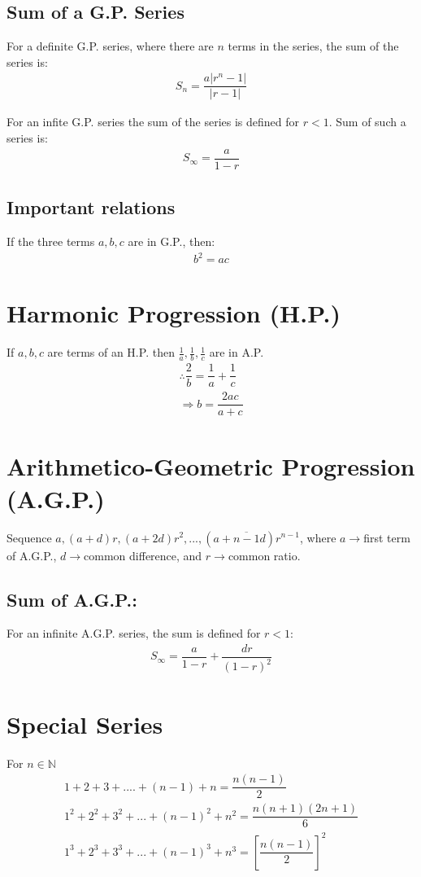 \subsection{Sum of a G.P.  Series}
For a definite G.P. series, where there are $n$ terms in the series, the sum of the series is:
\begin{align}
	S_n=\dfrac{a\lvert r^n-1 \rvert}{\lvert r-1 \rvert}
\end{align}

For an infite G.P. series the sum of the series is defined for $r<1$. Sum of such a series is:
\begin{align}
	S_\infty=\dfrac{a}{1-r}
\end{align}

\subsection{Important relations}
If the three terms $a,b,c$ are in G.P., then:
\begin{align}
	b^2=ac
\end{align}


\section{Harmonic Progression (H.P.)}
If $a,b,c$ are terms of an H.P. then $\frac{1}{a},\frac{1}{b},\frac{1}{c}$ are in A.P.
\begin{align}
	\therefore \dfrac{2}{b}=\dfrac{1}{a}+\dfrac{1}{c}\\
	\Rightarrow b=\dfrac{2ac}{a+c}
\end{align}


\section{\large{Arithmetico-Geometric Progression (A.G.P.)}}
Sequence $a, (a+d)r, (a+2d)r^2,...,(a+\overline{n-1}d)r^{n-1}$, where $a\rightarrow$first term of A.G.P., $d\rightarrow$common difference, and $r\rightarrow$common ratio.

\subsection{Sum of A.G.P.:}
For an infinite A.G.P. series, the sum is defined for $r<1$:
\begin{align}
	S_\infty=\dfrac{a}{1-r}+\dfrac{dr}{(1-r)^2}
\end{align}


\section{Special Series}
For $n\in\mathbb{N}$
\begin{align}
	1+2+3+....+(n-1)+n=\dfrac{n(n-1)}{2}\\
	1^2+2^2+3^2+...+(n-1)^2+n^2=\dfrac{n(n+1)(2n+1)}{6}\\
	1^3+2^3+3^3+...+(n-1)^3+n^3=[\dfrac{n(n-1)}{2}]^2
\end{align}


